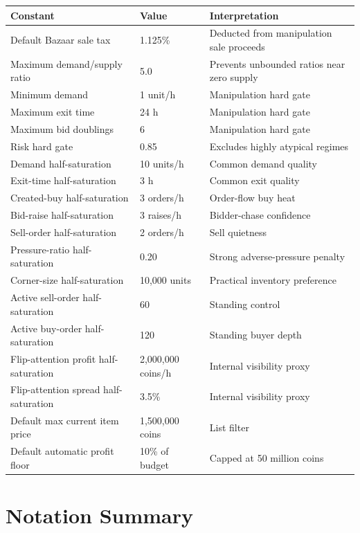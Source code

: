 \documentclass[11pt,a4paper]{article}
\begin{document}
\begin{longtable}{p{}p{}p{}}
\toprule
Constant & Value & Interpretation\\
\midrule
\endhead
Default Bazaar sale tax & 1.125\% & Deducted from manipulation sale proceeds\\
Maximum demand/supply ratio & 5.0 & Prevents unbounded ratios near zero supply\\
Minimum demand & 1 unit/h & Manipulation hard gate\\
Maximum exit time & 24 h & Manipulation hard gate\\
Maximum bid doublings & 6 & Manipulation hard gate\\
Risk hard gate & 0.85 & Excludes highly atypical regimes\\
Demand half-saturation & 10 units/h & Common demand quality\\
Exit-time half-saturation & 3 h & Common exit quality\\
Created-buy half-saturation & 3 orders/h & Order-flow buy heat\\
Bid-raise half-saturation & 3 raises/h & Bidder-chase confidence\\
Sell-order half-saturation & 2 orders/h & Sell quietness\\
Pressure-ratio half-saturation & 0.20 & Strong adverse-pressure penalty\\
Corner-size half-saturation & 10,000 units & Practical inventory preference\\
Active sell-order half-saturation & 60 & Standing control\\
Active buy-order half-saturation & 120 & Standing buyer depth\\
Flip-attention profit half-saturation & 2,000,000 coins/h & Internal visibility proxy\\
Flip-attention spread half-saturation & 3.5\% & Internal visibility proxy\\
Default max current item price & 1,500,000 coins & List filter\\
Default automatic profit floor & 10\% of budget & Capped at 50 million coins\\
\bottomrule
\end{longtable}

\section{Notation Summary}
\end{document}
